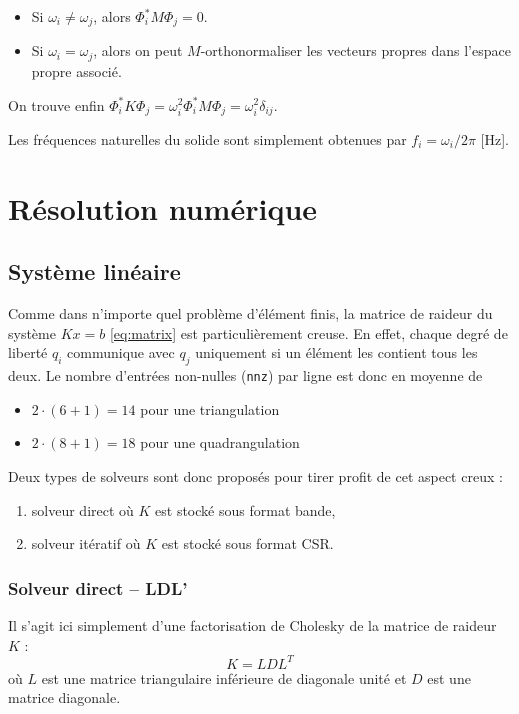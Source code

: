 \documentclass[12pt]{article}
\begin{document}
\begin{itemize}
    \setlength{\itemsep}{0pt}
    \item Si $\omega_i \neq \omega_j$, alors $\Phi_i^* M \Phi_j = 0$.
    \item Si $\omega_i = \omega_j$, alors on peut $M$-orthonormaliser les
    vecteurs propres dans l'espace propre associé.
\end{itemize}

On trouve enfin 
$\Phi_i^* K \Phi_j = \omega_i^2 \Phi_i^* M \Phi_j = \omega_i^2 \delta_{ij}$.

Les fréquences naturelles du solide sont simplement obtenues par 
$f_i = \omega_i / 2\pi$ [Hz].



\newpage
\section{Résolution numérique}

\subsection{Système linéaire}
Comme dans n'importe quel problème d'élément finis, la matrice de raideur 
du système $Kx=b$ \eqref{eq:matrix} est particulièrement creuse. En effet,
chaque degré de liberté $q_i$ communique avec $q_j$ uniquement si un élément
les contient tous les deux. Le nombre d'entrées non-nulles (\texttt{nnz}) 
par ligne est donc en moyenne de 
\begin{itemize}
    \item $2\cdot (6+1) = 14$ pour une triangulation
    \item $2\cdot (8+1) = 18$ pour une quadrangulation
\end{itemize}

Deux types de solveurs sont donc proposés pour tirer profit de cet
aspect creux :
\begin{enumerate}
    \item solveur direct où $K$ est stocké sous format bande,
    \item solveur itératif où $K$ est stocké sous format CSR.
\end{enumerate}

\subsubsection{Solveur direct -- LDL'}
Il s'agit ici simplement d'une factorisation de Cholesky de la matrice de
raideur $K$ :
\begin{equation}
    K = L D L^T
\end{equation}
où $L$ est une matrice triangulaire inférieure de diagonale unité et 
$D$ est une matrice diagonale. 
\end{document}

